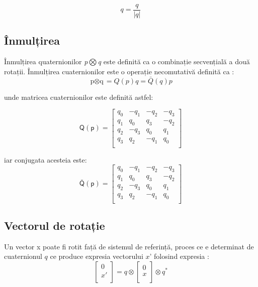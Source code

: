 \begin{equation}
q=\frac{q}{|q|}
\end{equation}



\subsection{Înmulțirea}

\-\hspace{1cm}Înmulțirea quaternionilor \textit{\textit{p$\bigotimes$q}} este definită ca o combinație secvențială a două rotații. Înmulțirea cuaternionilor este o operație necomutativă definită ca \cite{quatro}: 
\begin{equation}
\text{p$\otimes$q}=Q(p)q= \bar{Q}(q)p
\end{equation}

unde matricea cuaternionilor este definită astfel:

\begin{equation}
\mathsf{Q(p)} =
\begin{bmatrix}
q_0 & -q_1 & -q_2 & -q_3\\
q_1 & q_0 & q_3 & -q_2\\
q_2 & -q_3 & q_0 & q_1\\
q_3 & q_2 & -q_1 & q_0\\
\end{bmatrix}
\end{equation}

iar conjugata acesteia este:
\begin{equation}
\mathsf{\bar{Q}(p)} =
\begin{bmatrix}
q_0 & -q_1 & -q_2 & -q_3\\
q_1 & q_0 & q_3 & -q_2\\
q_2 & -q_3 & q_0 & q_1\\
q_3 & q_2 & -q_1 & q_0\\
\end{bmatrix}
\end{equation}

\subsection{Vectorul de rotație}

\-\hspace{1cm}Un vector x poate fi rotit față de sistemul de referință, proces ce e determinat de cuaternionul $q$ ce produce expresia vectorului $x’$ folosind expresia \cite{quatro}:
\begin{equation}
\begin{bmatrix}
	0\\
	x'\\
\end{bmatrix}
=
q\otimes
\begin{bmatrix}
	0\\
	x\\
\end{bmatrix}
\otimes q^*
\end{equation}

